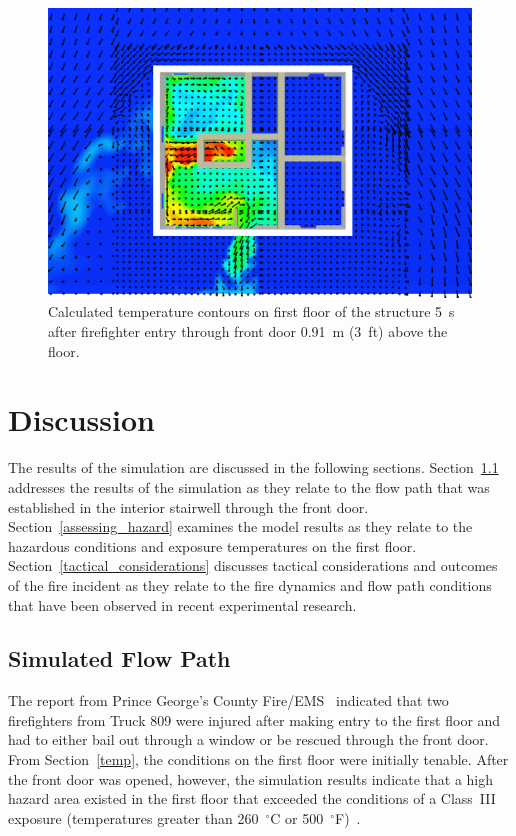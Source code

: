 \documentclass[12pt,oneside]{book}
\begin{document}
\begin{figure}[!ht]
\includegraphics[trim = 1in 1in 1in 1in, clip=true, width=.65\textwidth]{../Figures/temperature_slice_105s}


\caption[Calculated temperature on first floor 5~s after front door opens]
{Calculated temperature contours on first floor of the structure 5~s after firefighter entry through front door 0.91~m (3~ft) above the floor.}
\label{fig:temperature_slice_105s}
\end{figure}

\clearpage

\chapter{Discussion}
\label{discuss}
The results of the simulation are discussed in the following sections. Section~\ref{simulated_flow_path} addresses the results of the simulation as they relate to the flow path that was established in the interior stairwell through the front door. Section~\ref{assessing_hazard} examines the model results as they relate to the hazardous conditions and exposure temperatures on the first floor. Section~\ref{tactical_considerations} discusses tactical considerations and outcomes of the fire incident as they relate to the fire dynamics and flow path conditions that have been observed in recent experimental research.

\section{Simulated Flow Path}
\label{simulated_flow_path}

The report from Prince George's County Fire/EMS~\cite{PGCounty2013} indicated that two firefighters from Truck 809 were injured after making entry to the first floor and had to either bail out through a window or be rescued through the front door. From Section~\ref{temp}, the conditions on the first floor were initially tenable. After the front door was opened, however, the simulation results indicate that a high hazard area existed in the first floor that exceeded the conditions of a Class~III exposure (temperatures greater than 260~$^{\circ}$C or 500~$^{\circ}$F)~\cite{Donnelly2006}.
\end{document}
